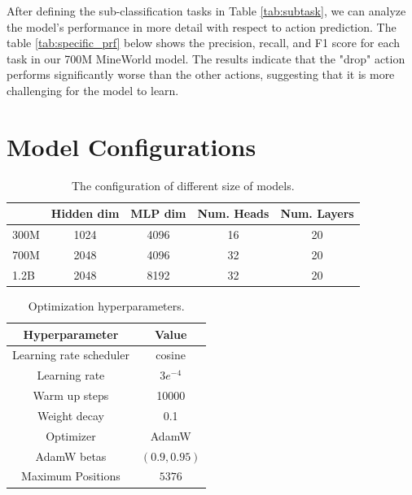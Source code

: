 \documentclass{article} %
\begin{document}
After defining the sub-classification tasks in Table \ref{tab:subtask}, we can analyze the model’s performance in more detail with respect to action prediction. The table \ref{tab:specific_prf} below shows the precision, recall, and F1 score for each task in our 700M MineWorld model. The results indicate that the "drop" action performs significantly worse than the other actions, suggesting that it is more challenging for the model to learn.

\section{Model Configurations}
\label{app:model_config}

\begin{table}[htbp]
    \centering
    \caption{The configuration of different size of models.}
    \begin{tabular}{l|c|c|c|c}
        \toprule[1pt]
            & \textbf{Hidden dim} & \textbf{MLP dim} & \textbf{Num. Heads} & \textbf{Num. Layers} \\
        \midrule
        300M &  1024 & 4096 & 16 & 20  \\
        700M &  2048 & 4096 & 32 & 20 \\
        1.2B &  2048 & 8192 & 32 & 20 \\
        \bottomrule[1pt]
    \end{tabular}
    \label{tab:model_arch}
\end{table}

\begin{table}[htbp]
    \centering
    \caption{Optimization hyperparameters.}
    \begin{tabular}{c|c}
        \toprule[1pt]
       \textbf{Hyperparameter}  &  \textbf{Value} \\
       \midrule
       Learning rate scheduler   &  cosine \\
       Learning rate & $3e^{-4}$ \\
       Warm up steps & 10000 \\
       Weight decay & 0.1 \\
       Optimizer & AdamW \\
       AdamW betas & $(0.9, 0.95)$ \\
       Maximum Positions & $5376$ \\
       \bottomrule[1pt]
    \end{tabular}
    \label{tab:hyperparams}
\end{table}
\end{document}
